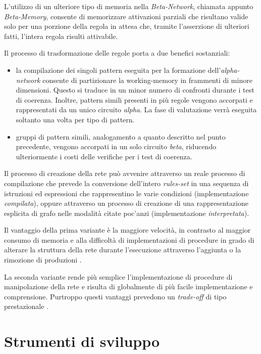 L'utilizzo di un ulteriore tipo di memoria nella \emph{Beta-Network}, chiamata appunto \emph{Beta-Memory}, consente di memorizzare attivazioni parziali che risultano valide solo per una porzione della regola in attesa che, tramite l'asserzione di ulteriori fatti, l'intera regola risulti attivabile.

Il processo di trasformazione delle regole porta a due benefici sostanziali:
\begin{itemize}
	\item la compilazione dei singoli pattern eseguita per la formazione dell'\emph{alpha-network} consente di partizionare la working-memory in frammenti di minore dimensioni. Questo si traduce in un minor numero di confronti durante i test di coerenza. Inoltre, pattern simili presenti in più regole vengono accorpati e rappresentati da un unico circuito \emph{alpha}. La fase di valutazione verrà eseguita soltanto una volta per tipo di pattern.
	\item gruppi di pattern simili, analogamento a quanto descritto nel punto precedente, vengono accorpati in un solo circuito \emph{beta}, riducendo ulteriormente i costi delle verifiche per i test di coerenza.
\end{itemize}

Il processo di creazione della rete può avvenire attraverso un reale processo di compilazione \cite{forgy1982} che prevede la conversione dell'intero \emph{rules-set} in una sequenza di istruzioni ed espressioni che rappresentino le varie condizioni (implementazione \emph{compilata}), oppure attraverso un processo di creazione di una rappresentazione esplicita di grafo nelle modalità citate poc'anzi (implementazione \emph{interpretata}). 

Il vantaggio della prima variante è la maggiore velocità, in contrasto al maggior consumo di memoria e alla difficoltà di implementazioni di procedure in grado di alterare la struttura della rete durante l'esecuzione attraverso l'aggiunta o la rimozione di produzioni \cite{Doorenbos95productionmatching}.

La seconda variante rende più semplice l'implementazione di procedure di manipolazione della rete e risulta di globalmente di più facile implementazione e comprensione. Purtroppo questi vantaggi prevedono un \emph{trade-off} di tipo prestazionale \cite{Doorenbos95productionmatching}.


\section{Strumenti di sviluppo}

